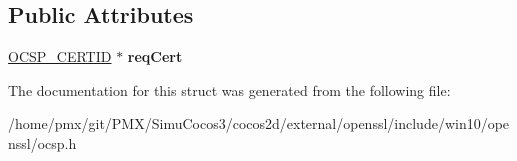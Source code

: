 \subsection*{Public Attributes}
\begin{DoxyCompactItemize}
\item 
\mbox{\label{structocsp__one__request__st_acb10504260c2974865557a3d04ff0fa5}} 
\hyperlink{structocsp__cert__id__st}{O\+C\+S\+P\+\_\+\+C\+E\+R\+T\+ID} $\ast$ {\bfseries req\+Cert}
\end{DoxyCompactItemize}


The documentation for this struct was generated from the following file\+:\begin{DoxyCompactItemize}
\item 
/home/pmx/git/\+P\+M\+X/\+Simu\+Cocos3/cocos2d/external/openssl/include/win10/openssl/ocsp.\+h\end{DoxyCompactItemize}
